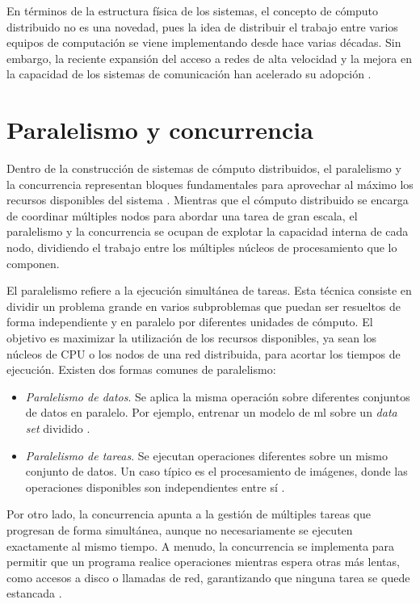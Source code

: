 En términos de la estructura física de los sistemas, el concepto de cómputo distribuido no es una novedad, pues la idea de distribuir el trabajo entre varios equipos de computación se viene implementando desde hace varias décadas. Sin embargo, la reciente expansión del acceso a redes de alta velocidad y la mejora en la capacidad de los sistemas de comunicación han acelerado su adopción \citep{kurose2012networks}.

\section{Paralelismo y concurrencia}

Dentro de la construcción de sistemas de cómputo distribuidos, el paralelismo y la concurrencia representan bloques fundamentales para aprovechar al máximo los recursos disponibles del sistema \citep{silberschatz2012operatingsystems}. Mientras que el cómputo distribuido se encarga de coordinar múltiples nodos para abordar una tarea de gran escala, el paralelismo y la concurrencia se ocupan de explotar la capacidad interna de cada nodo, dividiendo el trabajo entre los múltiples núcleos de procesamiento que lo componen.

El paralelismo refiere a la ejecución simultánea de tareas. Esta técnica consiste en dividir un problema grande en varios subproblemas que puedan ser resueltos de forma independiente y en paralelo por diferentes unidades de cómputo. El objetivo es maximizar la utilización de los recursos disponibles, ya sean los núcleos de CPU o los nodos de una red distribuida, para acortar los tiempos de ejecución. Existen dos formas comunes de paralelismo:

\begin{itemize}
    \item \emph{Paralelismo de datos}. Se aplica la misma operación sobre diferentes conjuntos de datos en paralelo. Por ejemplo, entrenar un modelo de \gls{ml} sobre un \emph{data set} dividido \citep{dean2012distributeddeepnetworks}.
    
    \item \emph{Paralelismo de tareas}. Se ejecutan operaciones diferentes sobre un mismo conjunto de datos. Un caso típico
    es el procesamiento de imágenes, donde las operaciones disponibles son independientes entre sí \citep{saxena2016imageprocessing}.

\end{itemize}

Por otro lado, la concurrencia apunta a la gestión de múltiples tareas que progresan de forma simultánea, aunque no necesariamente se ejecuten exactamente al mismo tiempo. A menudo, la concurrencia se implementa para permitir que un programa realice operaciones mientras espera otras más lentas, como accesos a disco o llamadas de red, garantizando que ninguna tarea se quede estancada \citep{mccool2012parallel}.

